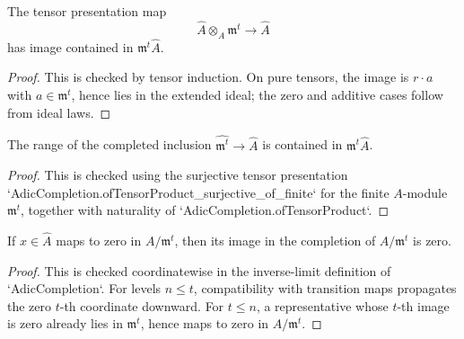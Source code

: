 \begin{lemma}
  \label{lem:adic_completion_power_tensor_image_le_power_image}
  The tensor presentation map
  \[
    \widehat A\otimes_A\mathfrak m^t\to\widehat A
  \]
  has image contained in \(\mathfrak m^t\widehat A\).
\end{lemma}

\begin{proof}
  This is checked by tensor induction.  On pure tensors, the image is
  \(r\cdot a\) with \(a\in\mathfrak m^t\), hence lies in the extended ideal;
  the zero and additive cases follow from ideal laws.
\end{proof}

\begin{lemma}
  \label{lem:adic_completion_power_submodule_range_le_power_image}
  The range of the completed inclusion
  \(\widehat{\mathfrak m^t}\to\widehat A\) is contained in
  \(\mathfrak m^t\widehat A\).
\end{lemma}

\begin{proof}
  This is checked using the surjective tensor presentation
  `AdicCompletion.ofTensorProduct\_surjective\_of\_finite` for the finite
  \(A\)-module \(\mathfrak m^t\), together with naturality of
  `AdicCompletion.ofTensorProduct`.
\end{proof}

\begin{lemma}
  \label{lem:adic_completion_map_quotient_power_eq_zero_of_eval_zero}
  If \(x\in\widehat A\) maps to zero in \(A/\mathfrak m^t\), then its image in
  the completion of \(A/\mathfrak m^t\) is zero.
\end{lemma}

\begin{proof}
  This is checked coordinatewise in the inverse-limit definition of
  `AdicCompletion`.  For levels \(n\le t\), compatibility with transition maps
  propagates the zero \(t\)-th coordinate downward.  For \(t\le n\), a
  representative whose \(t\)-th image is zero already lies in
  \(\mathfrak m^t\), hence maps to zero in \(A/\mathfrak m^t\).
\end{proof}

